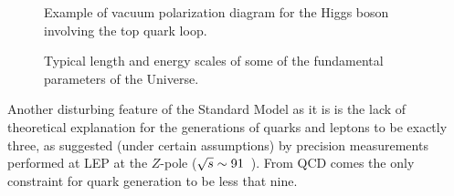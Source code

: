\begin{figure}[htb]\begin{center}
\caption{Example of vacuum polarization diagram 
  for the Higgs boson involving the top quark loop.}
\label{topLoop}\end{center}\end{figure}

\begin{figure}[h!tb]\begin{center}
        \subfigure{ %
}
	\caption{Typical length and energy scales
          of some of the fundamental parameters
          of the Universe.\label{fig:scales}}
\end{center}\end{figure}

Another disturbing feature of the Standard Model as it is 
is the lack of theoretical explanation for the generations 
of quarks and leptons to be exactly three, as suggested
(under certain assumptions) by precision measurements 
performed at LEP at the $Z$-pole ($\rts\sim 91$~\gev). 
From QCD comes the only constraint for quark generation
to be less that nine.

